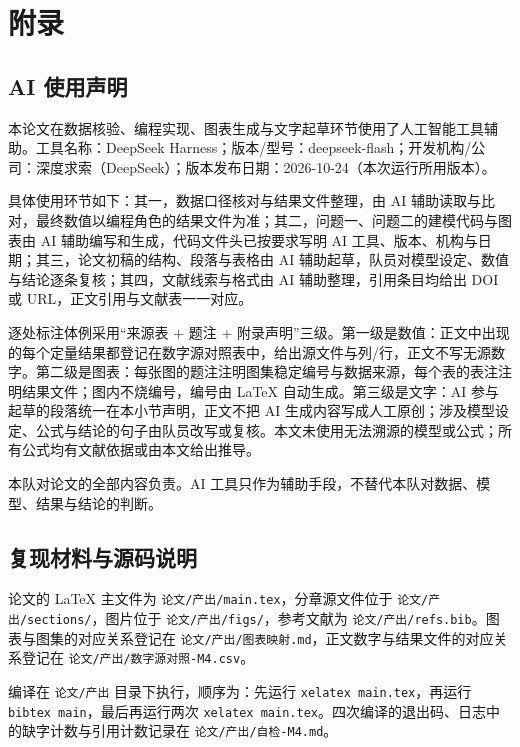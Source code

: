 \section{附录}

\subsection{AI 使用声明}

本论文在数据核验、编程实现、图表生成与文字起草环节使用了人工智能工具辅助。工具名称：DeepSeek Harness；版本/型号：deepseek-flash；开发机构/公司：深度求索（DeepSeek）；版本发布日期：2026-10-24（本次运行所用版本）。

具体使用环节如下：其一，数据口径核对与结果文件整理，由 AI 辅助读取与比对，最终数值以编程角色的结果文件为准；其二，问题一、问题二的建模代码与图表由 AI 辅助编写和生成，代码文件头已按要求写明 AI 工具、版本、机构与日期；其三，论文初稿的结构、段落与表格由 AI 辅助起草，队员对模型设定、数值与结论逐条复核；其四，文献线索与格式由 AI 辅助整理，引用条目均给出 DOI 或 URL，正文引用与文献表一一对应。

逐处标注体例采用“来源表 + 题注 + 附录声明”三级。第一级是数值：正文中出现的每个定量结果都登记在数字源对照表中，给出源文件与列/行，正文不写无源数字。第二级是图表：每张图的题注注明图集稳定编号与数据来源，每个表的表注注明结果文件；图内不烧编号，编号由 LaTeX 自动生成。第三级是文字：AI 参与起草的段落统一在本小节声明，正文不把 AI 生成内容写成人工原创；涉及模型设定、公式与结论的句子由队员改写或复核。本文未使用无法溯源的模型或公式；所有公式均有文献依据或由本文给出推导。

本队对论文的全部内容负责。AI 工具只作为辅助手段，不替代本队对数据、模型、结果与结论的判断。

\subsection{复现材料与源码说明}

论文的 LaTeX 主文件为 \texttt{论文/产出/}\allowbreak\texttt{main.tex}，分章源文件位于 \texttt{论文/产出/}\allowbreak\texttt{sections/}，图片位于 \texttt{论文/产出/}\allowbreak\texttt{figs/}，参考文献为 \texttt{论文/产出/}\allowbreak\texttt{refs.bib}。图表与图集的对应关系登记在 \texttt{论文/产出/}\allowbreak\texttt{图表映射.md}，正文数字与结果文件的对应关系登记在 \texttt{论文/产出/}\allowbreak\texttt{数字源对照-M4.csv}。

编译在 \texttt{论文/产出} 目录下执行，顺序为：先运行 \texttt{xelatex main.tex}，再运行 \texttt{bibtex main}，最后再运行两次 \texttt{xelatex main.tex}。四次编译的退出码、日志中的缺字计数与引用计数记录在 \texttt{论文/产出/}\allowbreak\texttt{自检-M4.md}。

